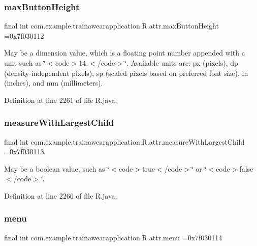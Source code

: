 \subsubsection{\texorpdfstring{maxButtonHeight}{maxButtonHeight}}
{\footnotesize\ttfamily final int com.\+example.\+trainawearapplication.\+R.\+attr.\+max\+Button\+Height =0x7f030112\hspace{0.3cm}{\ttfamily [static]}}

May be a dimension value, which is a floating point number appended with a unit such as \char`\"{}$<$code$>$14.\+5sp$<$/code$>$\char`\"{}. Available units are\+: px (pixels), dp (density-\/independent pixels), sp (scaled pixels based on preferred font size), in (inches), and mm (millimeters). 

Definition at line 2261 of file R.\+java.

\mbox{\label{classcom_1_1example_1_1trainawearapplication_1_1_r_1_1attr_a7c9cba83ce87d751598db498dbab69b2}} 
\subsubsection{\texorpdfstring{measureWithLargestChild}{measureWithLargestChild}}
{\footnotesize\ttfamily final int com.\+example.\+trainawearapplication.\+R.\+attr.\+measure\+With\+Largest\+Child =0x7f030113\hspace{0.3cm}{\ttfamily [static]}}

May be a boolean value, such as \char`\"{}$<$code$>$true$<$/code$>$\char`\"{} or \char`\"{}$<$code$>$false$<$/code$>$\char`\"{}. 

Definition at line 2266 of file R.\+java.

\mbox{\label{classcom_1_1example_1_1trainawearapplication_1_1_r_1_1attr_a7bf0fad85d31059368ab00b7130a1bdf}} 
\subsubsection{\texorpdfstring{menu}{menu}}
{\footnotesize\ttfamily final int com.\+example.\+trainawearapplication.\+R.\+attr.\+menu =0x7f030114\hspace{0.3cm}{\ttfamily [static]}}

